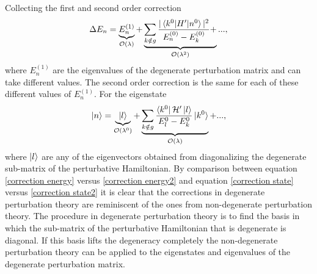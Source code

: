 Collecting the first and second order correction
\begin{equation}
	\Delta E_n=\underbrace{E_n^{(1)}}_{\mathcal{O}(\lambda)}+\underbrace{\sum_{k\notin g}\frac{|\braket{k^0|H'|n^0}|^2}{E_n^{(0)}-E_k^{(0)}}+}_{\mathcal{O}(\lambda^2)}..., 
	\label{correction energy2}
\end{equation} 
where $E_n^{(1)}$ are the eigenvalues of the degenerate perturbation matrix and can take different values. The second order correction is the same for each of these different values of $E_n^{(1)}$. For the eigenstate
\begin{equation}
	\ket{n}=\underbrace{\ket{l}}_{\mathcal{O}(\lambda^0)}+\underbrace{\sum_{k \notin g}\frac{\bra{k^0}\mathcal{H}'\ket{l}}{E_l^{0}-E_k^{0}}\ket{k^{0}}}_{\mathcal{O(\lambda)}}+...,
	\label{correction state2}
\end{equation} 
where $\ket{l}$ are any of the eigenvectors obtained from diagonalizing the degenerate sub-matrix of the perturbative Hamiltonian. By comparison between equation \eqref{correction energy} versus \eqref{correction energy2} and equation \eqref{correction state} versus \eqref{correction state2} it is clear that the corrections in degenerate perturbation theory are reminiscent of the ones from non-degenerate perturbation theory. The procedure in degenerate perturbation theory is to find the basis in which the sub-matrix of the perturbative Hamiltonian that is degenerate is diagonal. If this basis lifts the degeneracy completely the non-degenerate perturbation theory can be applied to the eigenstates and eigenvalues of the degenerate perturbation matrix.  


